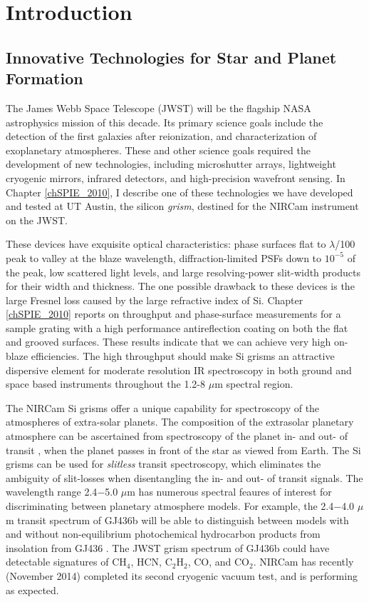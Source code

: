 \chapter{Introduction}

\section{Innovative Technologies for Star and Planet Formation}

The James Webb Space Telescope (JWST) will be the flagship NASA astrophysics mission of this decade.  Its primary science goals include the detection of the first galaxies after reionization, and characterization of exoplanetary atmospheres.  These and other science goals required the development of new technologies, including microshutter arrays, lightweight cryogenic mirrors, infrared detectors, and high-precision wavefront sensing.  In Chapter \ref{chSPIE_2010}, I describe one of these technologies we have developed and tested at UT Austin, the silicon \emph{grism}, destined for the NIRCam instrument \citep{Greene10} on the JWST.

These devices have exquisite optical characteristics: phase surfaces flat to $\lambda$/100 peak to valley at the blaze wavelength, diffraction-limited PSFs down to $10^{-5}$ of the peak, low scattered light levels, and large resolving-power slit-width products for their width and thickness.  The one possible drawback to these devices is the large Fresnel loss caused by the large refractive index of Si.  Chapter \ref{chSPIE_2010} reports on throughput and phase-surface measurements for a sample grating with a high performance antireflection coating on both the flat and grooved surfaces. These results indicate that we can achieve very high on-blaze efficiencies.  The high throughput should make Si grisms an attractive dispersive element for moderate resolution IR spectroscopy in both ground and space based instruments throughout the 1.2-8 $\mu$m spectral region.


The NIRCam Si grisms offer a unique capability for spectroscopy of the atmospheres of extra-solar planets.  The composition of the extrasolar planetary atmosphere can be ascertained from spectroscopy of the planet in- and out- of transit \citep{2008ApJ...673L..87R}, when the planet passes in front of the star as viewed from Earth.  The Si grisms can be used for \emph{slitless} transit spectroscopy, which eliminates the ambiguity of slit-losses when disentangling the in- and out- of transit signals.  The wavelength range 2.4$-$5.0 $\mu$m has numerous spectral feaures of interest for discriminating between planetary atmosphere models.  For example, the 2.4$-$4.0 $\mu$m transit spectrum of GJ436b will be able to distinguish between models with and without non-equilibrium photochemical hydrocarbon products from insolation from GJ436 \citep{2011ApJ...727...65S}.  The JWST grism spectrum of GJ436b could have detectable signatures of CH$_4$, HCN, C$_2$H$_2$, CO, and CO$_2$.  NIRCam has recently (November 2014) completed its second cryogenic vacuum test, and is performing as expected.

